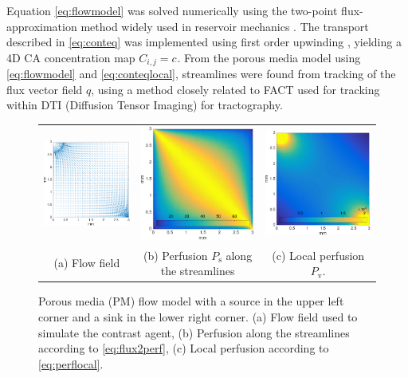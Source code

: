 \documentclass[journal,twocolumn]{IEEEtran}
\newcommand{\Perfv}{P_{\mathrm{v}}}
\newcommand{\Perfs}{P_{\mathrm{s}}}
\begin{document}
	Equation \eqref{eq:flowmodel} was solved numerically using the two-point flux-approximation method widely used in reservoir mechanics \cite{Aarnes2007}.
	The transport described in \eqref{eq:conteq} was implemented using first order upwinding \cite{Patankar80}, yielding a 4D CA concentration map $C_{i,j} = c_{}$.
	From the porous media model using \eqref{eq:flowmodel} and \eqref{eq:conteqlocal}, streamlines were found from tracking of the flux vector field $q$, using a method closely related to FACT \cite{Mori1998} used for tracking within DTI (Diffusion Tensor Imaging) for tractography. 
	
\begin{figure}[h!tb]
	\centering
	\begin{tabular}{c c c}
		\includegraphics[width=.3\textwidth]{figs/qmat.pdf} & \includegraphics[width=.3\textwidth]{figs/perfmat.pdf} & \includegraphics[width=.3\textwidth]{figs/lperfmat.pdf}\\
		(a) Flow field & (b) Perfusion $\Perfs$ along the streamlines  & (c) Local perfusion $\Perfv$.
	\end{tabular}
	\caption{Porous media (PM) flow model with a source in the upper left corner and a sink in the lower right corner. (a) Flow field used to simulate the contrast agent, (b) Perfusion along the streamlines according to \eqref{eq:flux2perf}, (c) Local perfusion according to \eqref{eq:perflocal}.}
        \label{fig:flowpressureperfusion}
\end{figure}
\end{document}
